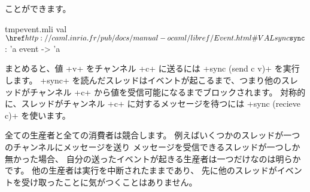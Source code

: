 ことができます。
%
\begin{listingcodefile}{tmpevent.mli}
val $\indexlibvalue{Event}{sync}$ : 'a event -> 'a
\end{listingcodefile}
%
まとめると、値 \ml+v+ をチャンネル \ml+c+ に送るには \ml+sync (send c v)+ を実行します。
\ml+sync+ を読んだスレッドはイベントが起こるまで、つまり他のスレッドがチャンネル \ml+c+
から値を受信可能になるまでブロックされます。
対称的に、スレッドがチャンネル \ml+c+ に対するメッセージを待つには
\ml+sync (recieve c)+ を使います。

全ての生産者と全ての消費者は競合します。
例えばいくつかのスレッドが一つのチャンネルにメッセージを送り
メッセージを受信できるスレッドが一つしか無かった場合、
自分の送ったイベントが起きる生産者は一つだけなのは明らかです。
他の生産者は実行を中断されたままであり、
先に他のスレッドがイベントを受け取ったことに気がつくことはありません。


